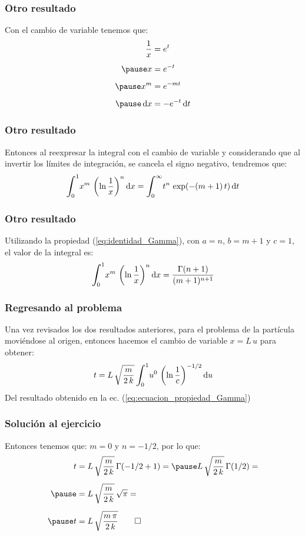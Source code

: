 \documentclass[12pt]{beamer}
\begin{document}
\begin{frame}
\frametitle{Otro resultado}
Con el cambio de variable tenemos que:
\begin{eqnarray*}
\begin{aligned}
\dfrac{1}{x} &= e^{t} \\[0.5em] \pause
x &= e^{-t} \\[0.5em] \pause
x^{m} &= e^{-m t} \\[0.5em] \pause
\dd{x} &= - e^{-t} \dd{t}
\end{aligned}
\end{eqnarray*}
\end{frame}
\begin{frame}
\frametitle{Otro resultado}
Entonces al reexpresar la integral con el cambio de variable y considerando que al invertir los límites de integración, se cancela el signo negativo, tendremos que:
\pause
\begin{align*}
\scaleint{6ex}_{\bs 0}^{1} x^{m} \, \left( \ln \dfrac{1}{x} \right)^{n} \dd{x} = \scaleint{6ex}_{\bs 0}^{\infty} t^{n} \, \exp(-(m+1) \, t) \dd{t}
\end{align*}
\end{frame}
\begin{frame}
\frametitle{Otro resultado}
Utilizando la propiedad (\ref{eq:identidad_Gamma}), con $a = n$, $b = m + 1$ y $c = 1$, el valor de la integral es:
\pause 
\begin{align}
\scaleint{6ex}_{\bs 0}^{1} x^{m} \, \left( \ln \dfrac{1}{x} \right)^{n} \dd{x} = \dfrac{\Gamma (n + 1)}{(m + 1)^{n+1}}
\label{eq:ecuacion_propiedad_Gamma}
\end{align}
\end{frame}
\begin{frame}
\frametitle{Regresando al problema}
Una vez revisados los dos resultados anteriores, para el problema de la partícula moviéndose al origen, entonces hacemos el cambio de variable $x = L \, u$ para obtener:
\pause 
\begin{align*}
t = L \, \sqrt{\dfrac{m}{2 \, k}} \, \scaleint{6ex}_{\bs 0}^{1} u^{0} \, \left( \ln \dfrac{1}{c} \right)^{-1/2} \dd{u}
\end{align*}
\pause
Del resultado obtenido en la ec. (\ref{eq:ecuacion_propiedad_Gamma})
\end{frame}
\begin{frame}
\frametitle{Solución al ejercicio}
Entonces tenemos que: $m = 0$ y $n = -1/2$, por lo que:
\pause
\begin{eqnarray*}
\begin{aligned}
t &= L \, \sqrt{\dfrac{m}{2 \, k}} \, \Gamma(-1/2 + 1) = \pause L \, \sqrt{\dfrac{m}{2 \, k}} \, \Gamma(1/2) = \\[0.5em] \pause
&= L \, \sqrt{\dfrac{m}{2 \, k}} \, \sqrt{\pi} = \\[0.5em] \pause
t &= L \, \sqrt{\dfrac{m \, \pi}{2 \, k}} \qed
\end{aligned}
\end{eqnarray*}
\end{frame}
\end{document}
